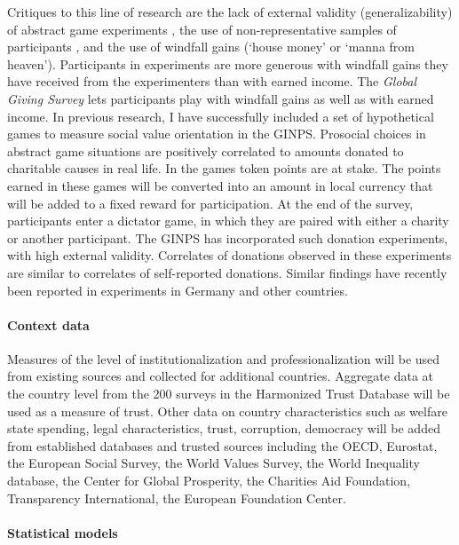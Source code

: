 \documentclass[twocolumn, serif, rga, numeric]{jote-article}
\begin{document}
Critiques to this line of research are the lack of external validity (generalizability) of abstract game experiments \cite{Levitt2007, -119}, the use of non-representative samples of participants \cite{Henrich2010}, and the use of windfall gains (`house money' or `manna from heaven').\cite{Hertwig2001}
Participants in experiments are more generous with windfall gains they have received from the experimenters than with earned income.\cite{Carlsson2013, -123} The \emph{Global Giving Survey}
lets participants play with windfall gains as well as with earned income. In previous research, I have successfully included a set of hypothetical games to measure social value orientation in the GINPS.
Prosocial choices in abstract game situations are positively correlated to amounts donated to charitable causes in real life.\cite{VanLange2007} In the games token points are at stake.
The points earned in these games will be converted into an amount in local currency that will be added to a fixed reward for participation.
At the end of the survey, participants enter a dictator game, in which they are paired with either a charity or another participant. The GINPS has incorporated such donation experiments, with high external validity.
Correlates of donations observed in these experiments are similar to correlates of self-reported donations.\cite{Bekkers2007}
Similar findings have recently been reported in experiments in Germany and other countries.\cite{Falk2015, Kistler2015}

\paragraph{Context data}

Measures of the level of institutionalization and professionalization will be used from existing sources\cite{Wiepking2015} and collected for additional countries. Aggregate data at the country level from the 200 surveys in the Harmonized Trust Database will be used as a measure of trust.\cite{Wilhelm2006} Other data on country characteristics such as welfare state spending, legal characteristics, trust, corruption, democracy will be added from established databases and trusted sources including the OECD, Eurostat, the European Social Survey, the World Values Survey, the World Inequality database, the Center for Global Prosperity, the Charities Aid Foundation, Transparency International, the European Foundation Center.

\paragraph{Statistical models}
\end{document}
